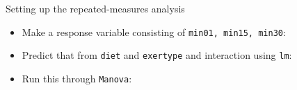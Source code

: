 \begin{frame}[fragile]{Setting up the repeated-measures analysis}
  
  \begin{itemize}
  \item Make a response variable consisting of \texttt{min01, min15, min30}:
\begin{knitrout}
\color{fgcolor}\begin{kframe}
\begin{alltt}
\hlkwb{=}
\end{alltt}
\end{kframe}
\end{knitrout}
\item Predict that from \texttt{diet} and \texttt{exertype} and
  interaction using \texttt{lm}:
\begin{knitrout}
\color{fgcolor}\begin{kframe}
\begin{alltt}
\hlkwb{=}\hlopt{~}\hlopt{*}
\end{alltt}
\end{kframe}
\end{knitrout}

\item Run this through \texttt{Manova}:
\begin{knitrout}
\color{fgcolor}\begin{kframe}
\begin{alltt}
\hlkwb{=}
\hlkwb{=}
\hlkwb{=}\hlopt{::}
                  \hlstd{=}\hlopt{~}
\end{alltt}
\end{kframe}
\end{knitrout}
  \end{itemize}
  
\end{frame}

